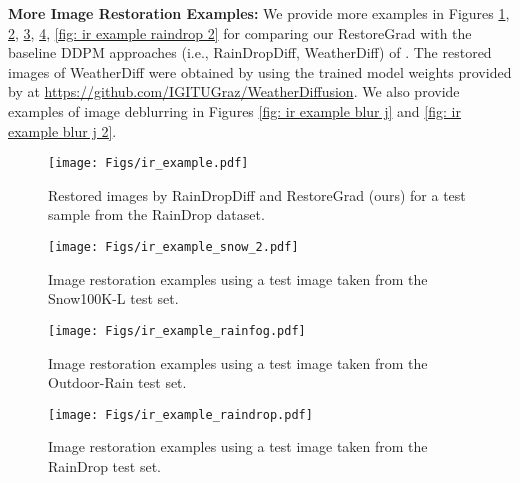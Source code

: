 \vspace{0.2cm}

\noindent\textbf{More Image Restoration Examples:}
We provide more examples in Figures \ref{fig: ir example randropdiff}, \ref{fig: ir example snow 2}, \ref{fig: ir example rainfog},  \ref{fig: ir example raindrop}, \ref{fig: ir example raindrop 2} for comparing our RestoreGrad with the baseline DDPM approaches (i.e., RainDropDiff, WeatherDiff) of \citet{ozdenizci2023restoring}. The restored images of WeatherDiff were obtained by using the trained model weights provided by \citet{ozdenizci2023restoring} at \url{https://github.com/IGITUGraz/WeatherDiffusion}. We also provide examples of image deblurring in Figures \ref{fig: ir example blur j} and \ref{fig: ir example blur j 2}.

\vspace{0.2cm}

\begin{figure}[!hp]
    \centering
    \texttt{[image: Figs/ir\_example.pdf]}
    \caption{Restored images by RainDropDiff \citep{ozdenizci2023restoring} and RestoreGrad (ours) for a test sample from the RainDrop dataset.} 
\label{fig: ir example randropdiff}
\end{figure}

\vspace{0.5cm}

\begin{figure}[!tp]
    \centering
    \texttt{[image: Figs/ir\_example\_snow\_2.pdf]}
    \caption{Image restoration examples using a test image taken from the Snow100K-L test set.} 
\label{fig: ir example snow 2}
\end{figure}

\vspace{0.5cm}

\begin{figure}[!tp]
    \centering
    \texttt{[image: Figs/ir\_example\_rainfog.pdf]}
    \caption{Image restoration examples using a test image taken from the Outdoor-Rain test set.} 
\label{fig: ir example rainfog}
\end{figure}

\vspace{0.5cm}

\begin{figure}[!tp]
    \centering
    \texttt{[image: Figs/ir\_example\_raindrop.pdf]}
    \caption{Image restoration examples using a test image taken from the RainDrop test set.} 
\label{fig: ir example raindrop}
\end{figure}

